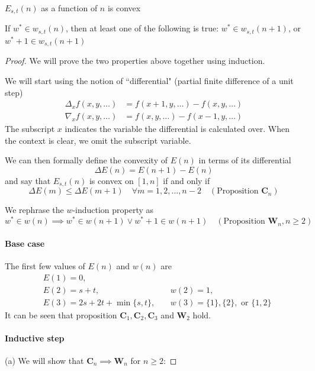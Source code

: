 \documentclass[]{article}
\begin{document}
\vspace{1cm}
\begin{lemma}[$n$-convexity]
$E_{s,t}(n)$ as a function of $n$ is convex
\end{lemma}
\begin{lemma}[$w$-induction]
	If $w^*\in w_{s,t}(n)$, then at least one of the following is true: $w^*\in w_{s,t}(n+1)$, or $w^*+1\in w_{s,t}(n+1)$
\end{lemma}
\begin{proof}
We will prove the two properties above together using induction.

We will start using the notion of ``differential" (partial finite difference of a unit step)
\begin{align*}
\Delta_x f(x,y,\dots) &= f(x + 1,y,\dots) - f(x,y,\dots)\\
\nabla_x f(x,y,\dots) &= f(x ,y,\dots) - f(x - 1,y,\dots)
\end{align*}
The subscript $x$ indicates the variable the differential is calculated over. When the context is clear, we omit the subscript variable.

We can then formally define the convexity of $E(n)$ in terms of its differential
\[  
\Delta E(n) = E(n+1) - E(n)
\]
and say that $E_{s,t}(n)$ is convex on $[1,n]$ if and only if
\[
 \Delta E(m)\le \Delta E(m+1)\quad\forall m = 1,2,\dots,n-2\quad (\text{Proposition } \mathbf{C}_n)
\]

We rephrase the $w$-induction property as
\[
w^*\in w(n) \implies w^* \in w(n+1) \lor w^*+1 \in w(n+1) \quad (\text{Proposition } \mathbf{W}_n, n\geq 2)
\]


\paragraph{Base case}
The first few values of $E(n)$ and $w(n)$ are 
\begin{align*}
&E(1) = 0,\ &&\\
&E(2) = s + t, \ &&w(2) = 1,\\
&E(3) = 2s + 2t + \min\{s, t\}, \ &&w(3) = \{1\}, \{2\},\text{ or }\{1,2\}
\end{align*}
It can be seen that proposition $\mathbf{C}_1, \mathbf{C}_2, \mathbf{C}_3$ and $\mathbf{W}_2$ hold.

\paragraph{Inductive step} (a) We will show that $\mathbf{C}_n \implies \mathbf{W}_n$ for $n\ge 2$:


\end{proof}
\end{document}
